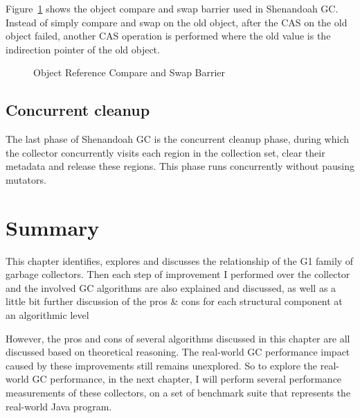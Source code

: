 Figure~\ref{fig:objectcasbarrier} shows the object compare and swap barrier used in Shenandoah GC.
Instead of simply compare and swap on the old object, after the CAS on the old object failed,
another CAS operation is performed where the old value is the indirection pointer of the old object.

\begin{figure}
  \centering
  
  \caption{Object Reference Compare and Swap Barrier} 
  \label{fig:objectcasbarrier}
\end{figure}

\subsection{Concurrent cleanup}

The last phase of Shenandoah GC is the concurrent cleanup phase, during which the
collector concurrently visits each region in the collection set, clear their metadata
and release these regions. This phase runs concurrently without pausing mutators.



\section{Summary}

This chapter identifies, explores and discusses the relationship of the G1 family of garbage collectors.
Then each step of improvement I performed over the collector and the involved GC algorithms
are also explained and discussed, as well as a little bit further discussion of the
pros \& cons for each structural component at an algorithmic level

However, the pros and cons of several algorithms discussed in this chapter are
all discussed based on theoretical reasoning.
The real-world GC performance impact caused by these improvements still remains unexplored.
So to explore the real-world GC performance, in the next chapter, I will perform several performance
measurements of these collectors, on a set of benchmark suite that represents the
real-world Java program.


